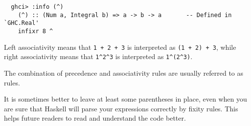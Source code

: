 \documentclass[notoc,notitlepage]{tufte-book}
\begin{document}
\begin{lstlisting}
  ghci> :info (^)
	(^) :: (Num a, Integral b) => a -> b -> a       -- Defined in `GHC.Real'
	infixr 8 ^
\end{lstlisting}

Left associativity means that \texttt{1 + 2 + 3} is interpreted as \texttt{(1 + 2) + 3}, while right associativity means that \texttt{1\^{}2\^{}3} is interpreted as \texttt{1\^{}(2\^{}3)}.

The combination of precedence and associativity rules are usually referred to as  rules.

\begin{note}
  It is sometimes better to leave at least some parentheses in place, even when you are sure that Haskell will parse your expressions correctly by fixity rules. This helps future readers to read and understand the code better.
\end{note}




\appendix

\backmatter

\pagestyle{plain}



\printindex
\end{document}
